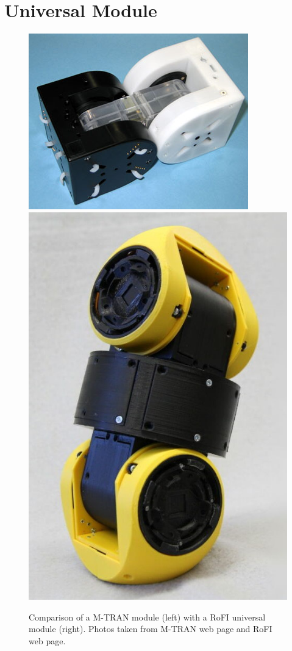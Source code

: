 \documentclass[
  digital, %
  table,   %
  oneside, %
  nolof,     %
  nolot,     %
]{fithesis3}
\begin{document}
\section{Universal Module}
\label{univ-module}

\begin{figure}
    \centering
    \includegraphics[height=.3\textheight]{data/mtran3.jpg}
    \includegraphics[height=.4\textheight]{data/rofi_universal_module.jpg}
    \caption{Comparison of a M-TRAN module (left) with a RoFI universal module (right). Photos taken from M-TRAN web page\cite{mtran-web} and RoFI web page\cite{rofi-web}.}
    \label{fig:mtran-rofi}
\end{figure}
\end{document}

